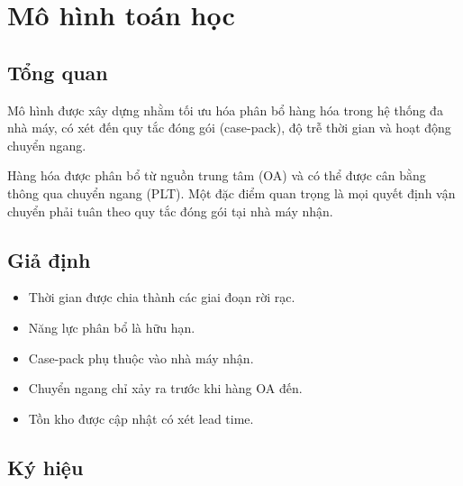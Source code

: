 \documentclass[12pt]{article}
\begin{document}
\section{Mô hình toán học}

\subsection{Tổng quan}

Mô hình được xây dựng nhằm tối ưu hóa phân bổ hàng hóa trong hệ thống đa nhà máy, có xét đến quy tắc đóng gói (case-pack), độ trễ thời gian và hoạt động chuyển ngang.

Hàng hóa được phân bổ từ nguồn trung tâm (OA) và có thể được cân bằng thông qua chuyển ngang (PLT). Một đặc điểm quan trọng là mọi quyết định vận chuyển phải tuân theo quy tắc đóng gói tại nhà máy nhận.

\subsection{Giả định}

\begin{itemize}
\item Thời gian được chia thành các giai đoạn rời rạc.
\item Năng lực phân bổ là hữu hạn.
\item Case-pack phụ thuộc vào nhà máy nhận.
\item Chuyển ngang chỉ xảy ra trước khi hàng OA đến.
\item Tồn kho được cập nhật có xét lead time.
\end{itemize}

\subsection{Ký hiệu}
\end{document}
